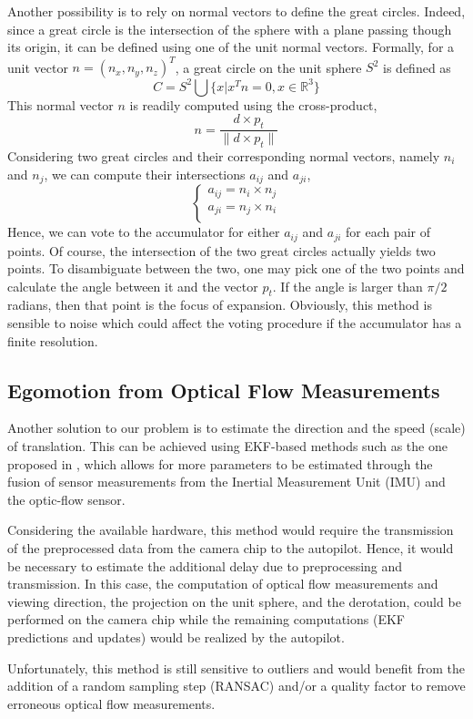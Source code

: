 Another possibility is to rely on normal vectors to define the great circles. Indeed, since a great circle is the intersection of the sphere with a plane passing though its origin, it can be defined using one of the unit normal vectors.
Formally, for a unit vector $n = (n_x, n_y, n_z)^T$, a great circle on the unit sphere $S^2$ is defined as
\begin{equation}
C = S^2\bigcup \{ x|x^Tn = 0, x \in \mathbb{R}^3 \}
\end{equation}
This normal vector $n$ is readily computed using the cross-product,
\begin{equation}
n = \dfrac{d \times p_t}{\|d \times p_t\|}
\end{equation}
Considering two great circles and their corresponding normal vectors, namely $n_i$ and $n_j$, we can compute their intersections $a_{ij}$ and $a_{ji}$,
\begin{equation}
\begin{cases}
a_{ij} = n_i \times n_j\\
a_{ji} = n_j \times n_i\\
\end{cases}
\end{equation}
Hence, we can vote to the accumulator for either $a_{ij}$ and $a_{ji}$ for each pair of points. Of course, the intersection of the two great circles actually yields two points. To disambiguate between the two, one may pick one of the two points and calculate the angle between it and the vector $p_t$. If the angle is larger than $\pi/2$ radians, then that point is the focus of expansion. Obviously, this method is sensible to noise which could affect the voting procedure if the accumulator has a finite resolution.

\subsection{Egomotion from Optical Flow Measurements}
Another solution to our problem is to estimate the direction and the speed (scale) of translation. This can be achieved using EKF-based methods such as the one proposed in \cite{ekf}, which allows for more parameters to be estimated through the fusion of sensor measurements from the Inertial Measurement Unit (IMU) and the optic-flow sensor. 

Considering the available hardware, this method would require the transmission of the preprocessed data from the camera chip to the autopilot. Hence, it would be necessary to estimate the additional delay due to preprocessing and transmission. In this case, the computation of optical flow measurements and viewing direction, the projection on the unit sphere, and the derotation, could be performed on the camera chip while the remaining computations (EKF predictions and updates) would be realized by the autopilot.

Unfortunately, this method is still sensitive to outliers and would benefit from the addition of a random sampling step (RANSAC) and/or a quality factor to remove erroneous optical flow measurements. 

\newpage